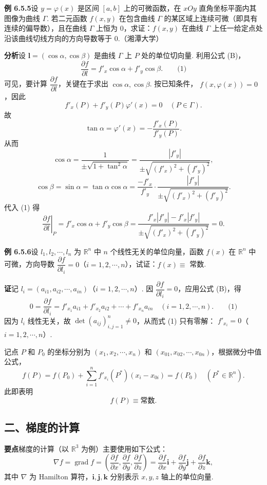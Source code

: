 \documentclass[UTF8,12pt,a4paper,fontset=fandol]{ctexart}
\begin{document}
\noindent\textbf{例 6.5.5}\quad 设 $y=\varphi(x)$ 是区间 $[a,b]$ 上的可微函数，在 $xOy$ 直角坐标平面内其图像为曲线 $\Gamma$. 若二元函数 $f(x,y)$ 在包含曲线 $\Gamma$ 的某区域上连续可微（即具有连续的偏导数），且在曲线 $\Gamma$ 上恒为 $0$，求证：$f(x,y)$ 在曲线 $\Gamma$ 上任一给定点处沿该曲线切线方向的方向导数等于 $0$.（湘潭大学）

\noindent\textbf{分析}\quad 设 $\mathbf l=(\cos\alpha,\cos\beta)$ 是曲线 $\Gamma$ 上 $P$ 处的单位切向量. 利用公式 (B)，
\[
  \frac{\partial f}{\partial l}=f'_x\cos\alpha+f'_y\cos\beta. \qquad\text{(1)}
\]
可见，要计算 $\dfrac{\partial f}{\partial l}$，关键在于求出 $\cos\alpha,\cos\beta$. 按已知条件，
$f(x,\varphi(x))=0$，因此
\[
  f'_x(P)+f'_y(P)\varphi'(x)=0\quad(P\in\Gamma).
\]
故
\[
  \tan\alpha=\varphi'(x)=-\frac{f'_x(P)}{f'_y(P)}.
\]
从而
\[
  \cos\alpha=\frac1{\pm\sqrt{1+\tan^2\alpha}}
  =
  \frac{|f'_y|}{\pm\sqrt{(f'_x)^2+(f'_y)^2}},
\]
\[
  \cos\beta=\sin\alpha=\tan\alpha\cos\alpha
  =
  \frac{-f'_x}{f'_y}\cdot
  \frac{|f'_y|}{\pm\sqrt{(f'_x)^2+(f'_y)^2}}.
\]
代入 (1) 得
\[
\left.\frac{\partial f}{\partial l}\right|_P
=f'_x\cos\alpha+f'_y\cos\beta
=
\frac{f'_x|f'_y|-f'_x|f'_y|}
{\pm\sqrt{(f'_x)^2+(f'_y)^2}}
=0.
\]

\noindent\textbf{例 6.5.6}\quad 设 $l_1,l_2,\cdots,l_n$ 为 $\mathbb R^n$ 中 $n$ 个线性无关的单位向量，函数 $f(x)$ 在 $\mathbb R^n$ 中可微，方向导数
$\dfrac{\partial f}{\partial l_i}=0$（$i=1,2,\cdots,n$），试证：$f(x)\equiv$ 常数.

\noindent\textbf{证}\quad 记 $l_i=(a_{i1},a_{i2},\cdots,a_{in})$（$i=1,2,\cdots,n$）. 因
$\dfrac{\partial f}{\partial l_i}=0$，应用公式 (B)，得
\[
  0=\frac{\partial f}{\partial l_i}
  =
  f'_{x_1}a_{i1}+f'_{x_2}a_{i2}+\cdots+f'_{x_n}a_{in}
  \quad(i=1,2,\cdots,n). \qquad\text{(1)}
\]
因为 $l_i$ 线性无关，故 $\det(a_{ij})_{i,j=1}^n\ne0$，从而式 (1) 只有零解：
$f'_{x_i}=0$（$i=1,2,\cdots,n$）.

记点 $P$ 和 $P_0$ 的坐标分别为 $(x_1,x_2,\cdots,x_n)$ 和
$(x_{01},x_{02},\cdots,x_{0n})$，根据微分中值公式，
\[
  f(P)=f(P_0)+\sum_{i=1}^n f'_{x_i}(P^*)(x_i-x_{0i})=f(P_0)
  \quad(P^*\in\mathbb R^n).
\]
此即表明
\[
  f(P)\equiv\text{常数}.
\]

\subsection*{二、梯度的计算}

\noindent\textbf{要点}\quad 梯度的计算（以 $\mathbb R^3$ 为例）主要使用如下公式：
\[
  \nabla f=\operatorname{grad}f
  =
  \left(\frac{\partial f}{\partial x},\frac{\partial f}{\partial y},\frac{\partial f}{\partial z}\right)
  =
  \frac{\partial f}{\partial x}\mathbf i
  +\frac{\partial f}{\partial y}\mathbf j
  +\frac{\partial f}{\partial z}\mathbf k,
\]
其中 $\nabla$ 为 Hamilton 算符，$\mathbf i,\mathbf j,\mathbf k$ 分别表示 $x,y,z$ 轴上的单位向量.
\end{document}
